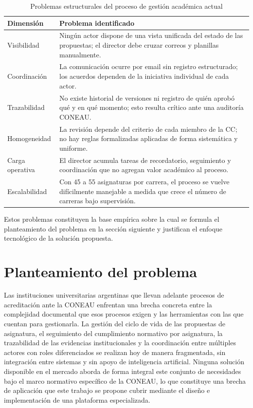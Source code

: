 \begin{table}[!h]
\centering
\caption{Problemas estructurales del proceso de gestión académica actual}
\label{tab:problemas_asis}
\begin{tabular}{p{3.4cm} p{10.6cm}}
\hline
\textbf{Dimensión} & \textbf{Problema identificado} \\
\hline
Visibilidad       & Ningún actor dispone de una vista unificada del estado de las propuestas; el director debe cruzar correos y planillas manualmente. \\[4pt]
Coordinación      & La comunicación ocurre por email sin registro estructurado; los acuerdos dependen de la iniciativa individual de cada actor. \\[4pt]
Trazabilidad      & No existe historial de versiones ni registro de quién aprobó qué y en qué momento; esto resulta crítico ante una auditoría CONEAU. \\[4pt]
Homogeneidad      & La revisión depende del criterio de cada miembro de la CC; no hay reglas formalizadas aplicadas de forma sistemática y uniforme. \\[4pt]
Carga operativa   & El director acumula tareas de recordatorio, seguimiento y coordinación que no agregan valor académico al proceso. \\[4pt]
Escalabilidad     & Con 45 a 55 asignaturas por carrera, el proceso se vuelve difícilmente manejable a medida que crece el número de carreras bajo supervisión. \\
\hline
\end{tabular}
\end{table}

Estos problemas constituyen la base empírica sobre la cual se formula el planteamiento del problema en la sección siguiente y justifican el enfoque tecnológico de la solución propuesta.

\section{Planteamiento del problema}
\label{sec:problema}

Las instituciones universitarias argentinas que llevan adelante procesos de acreditaci\'{o}n ante la CONEAU enfrentan una brecha concreta entre la complejidad documental que esos procesos exigen y las herramientas con las que cuentan para gestionarla. La gesti\'{o}n del ciclo de vida de las propuestas de asignatura, el seguimiento del cumplimiento normativo por asignatura, la trazabilidad de las evidencias institucionales y la coordinaci\'{o}n entre m\'{u}ltiples actores con roles diferenciados se realizan hoy de manera fragmentada, sin integraci\'{o}n entre sistemas y sin apoyo de inteligencia artificial. Ninguna soluci\'{o}n disponible en el mercado aborda de forma integral este conjunto de necesidades bajo el marco normativo espec\'{i}fico de la CONEAU, lo que constituye una brecha de aplicaci\'{o}n que este trabajo se propone cubrir mediante el dise\~{n}o e implementaci\'{o}n de una plataforma especializada.

